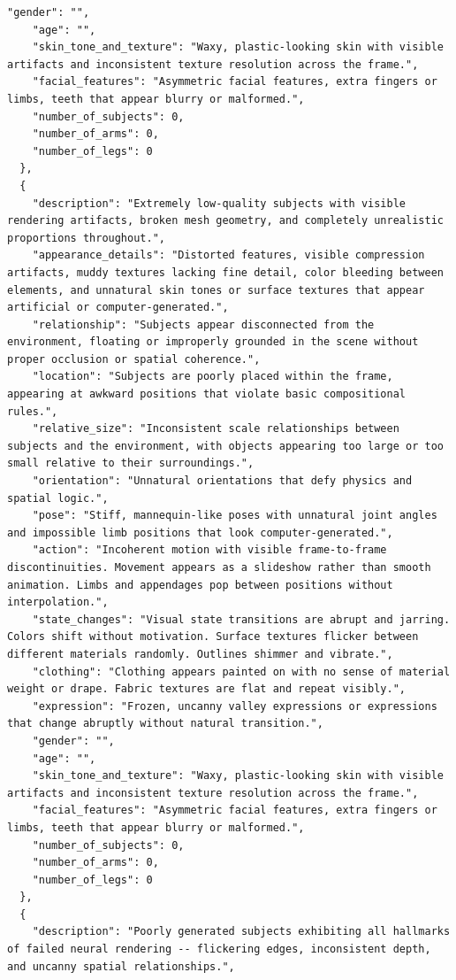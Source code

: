 \begin{tcolorbox}
\begin{Verbatim}[breaklines=true,breakanywhere=true,fontsize=\scriptsize]
    "gender": "",
    "age": "",
    "skin_tone_and_texture": "Waxy, plastic-looking skin with visible artifacts and inconsistent texture resolution across the frame.",
    "facial_features": "Asymmetric facial features, extra fingers or limbs, teeth that appear blurry or malformed.",
    "number_of_subjects": 0,
    "number_of_arms": 0,
    "number_of_legs": 0
  },
  {
    "description": "Extremely low-quality subjects with visible rendering artifacts, broken mesh geometry, and completely unrealistic proportions throughout.",
    "appearance_details": "Distorted features, visible compression artifacts, muddy textures lacking fine detail, color bleeding between elements, and unnatural skin tones or surface textures that appear artificial or computer-generated.",
    "relationship": "Subjects appear disconnected from the environment, floating or improperly grounded in the scene without proper occlusion or spatial coherence.",
    "location": "Subjects are poorly placed within the frame, appearing at awkward positions that violate basic compositional rules.",
    "relative_size": "Inconsistent scale relationships between subjects and the environment, with objects appearing too large or too small relative to their surroundings.",
    "orientation": "Unnatural orientations that defy physics and spatial logic.",
    "pose": "Stiff, mannequin-like poses with unnatural joint angles and impossible limb positions that look computer-generated.",
    "action": "Incoherent motion with visible frame-to-frame discontinuities. Movement appears as a slideshow rather than smooth animation. Limbs and appendages pop between positions without interpolation.",
    "state_changes": "Visual state transitions are abrupt and jarring. Colors shift without motivation. Surface textures flicker between different materials randomly. Outlines shimmer and vibrate.",
    "clothing": "Clothing appears painted on with no sense of material weight or drape. Fabric textures are flat and repeat visibly.",
    "expression": "Frozen, uncanny valley expressions or expressions that change abruptly without natural transition.",
    "gender": "",
    "age": "",
    "skin_tone_and_texture": "Waxy, plastic-looking skin with visible artifacts and inconsistent texture resolution across the frame.",
    "facial_features": "Asymmetric facial features, extra fingers or limbs, teeth that appear blurry or malformed.",
    "number_of_subjects": 0,
    "number_of_arms": 0,
    "number_of_legs": 0
  },
  {
    "description": "Poorly generated subjects exhibiting all hallmarks of failed neural rendering -- flickering edges, inconsistent depth, and uncanny spatial relationships.",

\end{Verbatim}
\end{tcolorbox}
